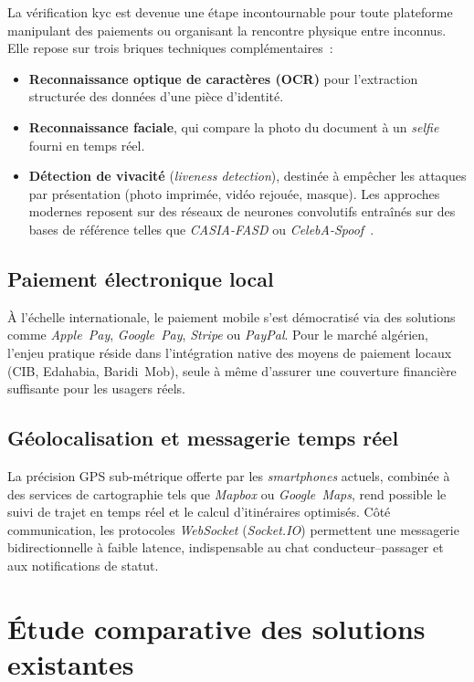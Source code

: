 \documentclass[12pt, a4paper, oneside]{report}
\begin{document}
La vérification \gls{kyc} est devenue une étape incontournable pour toute plateforme manipulant des paiements ou organisant la rencontre physique entre inconnus. Elle repose sur trois briques techniques complémentaires~:
\begin{itemize}
  \item \textbf{Reconnaissance optique de caractères (OCR)} pour l'extraction structurée des données d'une pièce d'identité.
  \item \textbf{Reconnaissance faciale}, qui compare la photo du document à un \textit{selfie} fourni en temps réel.
  \item \textbf{Détection de vivacité} (\textit{liveness detection}), destinée à empêcher les attaques par présentation (photo imprimée, vidéo rejouée, masque). Les approches modernes reposent sur des réseaux de neurones convolutifs entraînés sur des bases de référence telles que \textit{CASIA-FASD} ou \textit{CelebA-Spoof}~\cite{boulkenafet_liveness_2017}.
\end{itemize}

\subsection{Paiement électronique local}

À l'échelle internationale, le paiement mobile s'est démocratisé via des solutions comme \textit{Apple~Pay}, \textit{Google~Pay}, \textit{Stripe} ou \textit{PayPal}. Pour le marché algérien, l'enjeu pratique réside dans l'intégration native des moyens de paiement locaux (CIB, Edahabia, Baridi~Mob), seule à même d'assurer une couverture financière suffisante pour les usagers réels.

\subsection{Géolocalisation et messagerie temps réel}

La précision GPS sub-métrique offerte par les \textit{smartphones} actuels, combinée à des services de cartographie tels que \textit{Mapbox} ou \textit{Google~Maps}, rend possible le suivi de trajet en temps réel et le calcul d'itinéraires optimisés. Côté communication, les protocoles \textit{WebSocket} (\textit{Socket.IO}) permettent une messagerie bidirectionnelle à faible latence, indispensable au chat conducteur--passager et aux notifications de statut.

\section{Étude comparative des solutions existantes}
\label{sec:comparatif}
\end{document}
